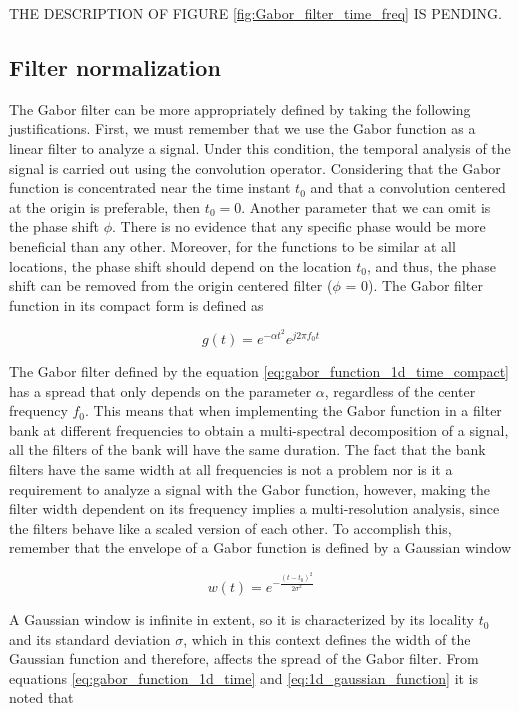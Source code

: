 THE DESCRIPTION OF FIGURE \ref{fig:Gabor_filter_time_freq} IS PENDING.

\subsection{Filter normalization}

The Gabor filter can be more appropriately defined by taking the following justifications. First, we must remember that we use the Gabor function as a linear filter to analyze a signal. Under this condition, the temporal analysis of the signal is carried out using the convolution operator. Considering that the Gabor function is concentrated near the time instant $t_0$ and that a convolution centered at the origin is preferable, then $t_0 = 0$. Another parameter that we can omit is the phase shift $\phi$. There is no evidence that any specific phase would be more beneficial than any other. Moreover, for the functions to be similar at all locations, the phase shift should depend on the location $t_0$, and thus, the phase shift can be removed from the origin centered filter ($\phi$ = 0). The Gabor filter function in its compact form is defined as 

\begin{equation}\label{eq:gabor_function_1d_time_compact}
    g(t) =  e ^{-\alpha t^2} e ^{j 2 \pi f_0 t }
\end{equation}

The Gabor filter defined by the equation \eqref{eq:gabor_function_1d_time_compact} has a spread that only depends on the parameter $\alpha$, regardless of the center frequency $f_0$. This means that when implementing the Gabor function in a filter bank at different frequencies to obtain a multi-spectral decomposition of a signal, all the filters of the bank will have the same duration. The fact that the bank filters have the same width at all frequencies is not a problem nor is it a requirement to analyze a signal with the Gabor function, however, making the filter width dependent on its frequency implies a multi-resolution analysis, since the filters behave like a scaled version of each other. To accomplish this, remember that the envelope of a Gabor function is defined by a Gaussian window 

\begin{equation}\label{eq:1d_gaussian_function}
    w(t)=e^{-\frac{(t-t_0)^2}{2\sigma^2}}
\end{equation}

A Gaussian window is infinite in extent, so it is characterized by its locality $t_0$ and its standard deviation $\sigma$, which in this context defines the width of the Gaussian function and therefore, affects the spread of the Gabor filter. From equations  \eqref{eq:gabor_function_1d_time} and \eqref{eq:1d_gaussian_function} it is noted that 

